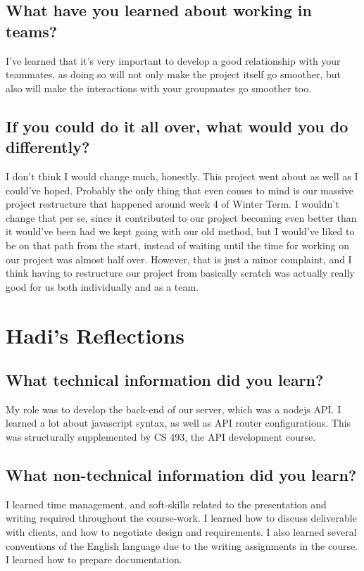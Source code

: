 \documentclass[onecolumn, draftclsnofoot,10pt, compsoc]{report}
\begin{document}
\subsection{What have you learned about working in teams?}
I've learned that it's very important to develop a good relationship with your teammates, as doing so will not only make the project itself go smoother, but also will make the interactions with your groupmates go smoother too.
\subsection{If you could do it all over, what would you do differently?}
I don't think I would change much, honestly. This project went about as well as I could've hoped. Probably the only thing that even comes to mind is our massive project restructure that happened around week 4 of Winter Term. I wouldn't change that per se, since it contributed to our project becoming even better than it would've been had we kept going with our old method, but I would've liked to be on that path from the start, instead of waiting until the time for working on our project was almost half over. However, that is just a minor complaint, and I think having to restructure our project from basically scratch was actually really good for us both individually and as a team.
\section{Hadi's Reflections}

\subsection{What technical information did you learn?}
My role was to develop the back-end of our server, which was a nodejs API. I learned a lot about javascript syntax, as well as API router configurations. This was structurally supplemented by CS 493, the API development course.
\subsection{What non-technical information did you learn?}
I learned time management, and soft-skills related to the presentation and writing required throughout the course-work. I learned how to discuss deliverable with clients, and how to negotiate design and requirements. I also learned several conventions of the English language due to the writing assignments in the course. I learned how to prepare documentation.
\end{document}

